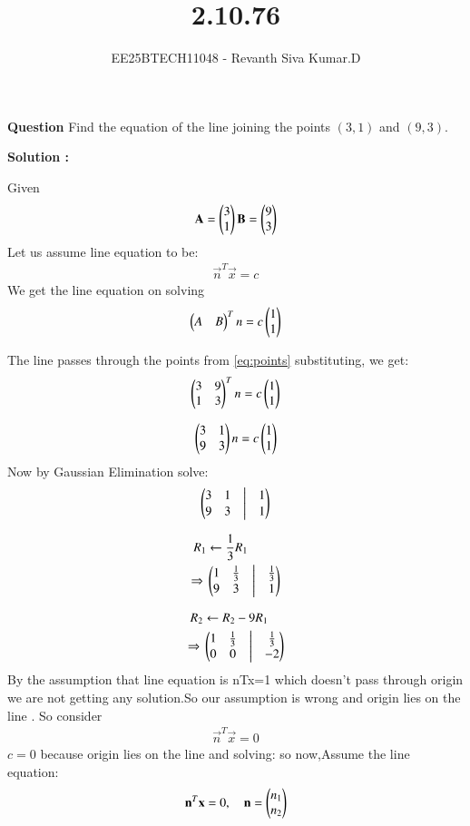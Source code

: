 \documentclass[journal]{IEEEtran}
\begin{document}

\vspace{3cm}

\title{2.10.76}
\author{EE25BTECH11048 - Revanth Siva Kumar.D}
{\let\newpage\relax\maketitle}
\textbf{Question}
Find the equation of the line joining the points $(3,1)$ and $(9,3)$. 

\textbf{Solution :} 

Given 
\begin{align}
    \mathbf{A}=\begin{pmatrix}3\\1\end{pmatrix} \mathbf{B}=\begin{pmatrix}9\\3\end{pmatrix} 
    \label{eq:points}
\end{align}
Let us assume line equation to be:
\begin{align}
    \vec{n}^T \vec{x} = c
\end{align} 
    We get the line equation on solving \[\begin{pmatrix}A&B\end{pmatrix}^Tn=c\begin{pmatrix}1\\1\end{pmatrix}\] 

The line passes through the points from \eqref{eq:points} substituting, we get:
\begin{align}
    \begin{pmatrix}3 & 9 \\
       1 & 3  \end{pmatrix}^Tn=c\begin{pmatrix}1 \\ 1\end{pmatrix}
\end{align}

\begin{align}
    \begin{pmatrix}3 & 1 \\
       9 & 3  \end{pmatrix}n=c\begin{pmatrix}1 \\ 1\end{pmatrix}
\end{align}
Now by Gaussian Elimination solve:
\begin{align}
\begin{pmatrix}3 & 1 & \big| & 1 \\
         9 & 3 & \big| & 1 \end{pmatrix}
\end{align}

\begin{align}
R_{1} &\leftarrow \frac{1}{3}R_{1} \nonumber\\
\Rightarrow\ 
&\myvec{1 & \frac{1}{3} & \big| & \frac{1}{3} \\
         9 & 3 & \big| & 1 }
\end{align}

\begin{align}
R_{2} &\leftarrow R_{2}-9R_{1} \nonumber\\
\Rightarrow\ 
&\myvec{1 & \frac{1}{3} & \big| & \frac{1}{3} \\
         0 & 0 & \big| & -2 }
\end{align}
By the assumption that line equation is nTx=1 which doesn't pass through origin we are not getting any solution.So our assumption is wrong and origin lies on the line . 
So consider \begin{align}
    \vec{n}^T \vec{x} = 0
\end{align} 
$c=0$ because origin lies on the line and solving:
so now,Assume the line equation:
\[
\mathbf{n}^T \mathbf{x} = 0, \quad 
\mathbf{n} = \begin{pmatrix}n_1\\n_2\end{pmatrix}
\]
\end{document}
